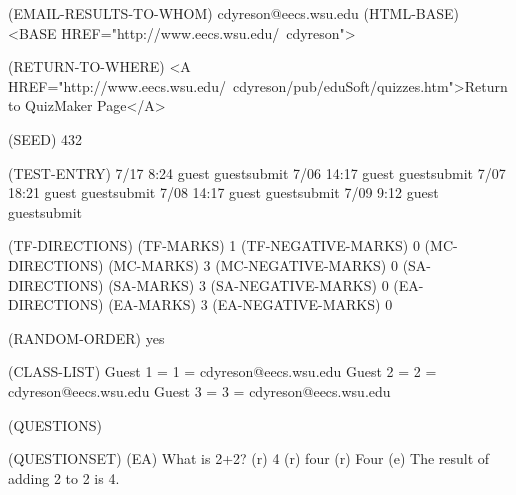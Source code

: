 
(EMAIL-RESULTS-TO-WHOM) 
cdyreson@eecs.wsu.edu
(HTML-BASE)
<BASE HREF="http://www.eecs.wsu.edu/~cdyreson">

(RETURN-TO-WHERE) 
<A HREF="http://www.eecs.wsu.edu/~cdyreson/pub/eduSoft/quizzes.htm">Return 
to QuizMaker Page</A>

(SEED) 432

(TEST-ENTRY)  
7/17    8:24   guest     guestsubmit
7/06   14:17   guest     guestsubmit 
7/07   18:21   guest     guestsubmit 
7/08   14:17   guest     guestsubmit
7/09    9:12   guest     guestsubmit

(TF-DIRECTIONS) 
(TF-MARKS) 1
(TF-NEGATIVE-MARKS) 0
(MC-DIRECTIONS) 
(MC-MARKS) 3
(MC-NEGATIVE-MARKS) 0
(SA-DIRECTIONS) 
(SA-MARKS) 3
(SA-NEGATIVE-MARKS) 0
(EA-DIRECTIONS) 
(EA-MARKS) 3
(EA-NEGATIVE-MARKS) 0

(RANDOM-ORDER) yes

(CLASS-LIST) 
Guest 1 = 1 = cdyreson@eecs.wsu.edu
Guest 2 = 2 = cdyreson@eecs.wsu.edu
Guest 3 = 3 = cdyreson@eecs.wsu.edu

(QUESTIONS) 

(QUESTIONSET)
(EA) What is 2+2?
(r) 4
(r) four
(r) Four
(e) The result of adding 2 to 2 is 4.

